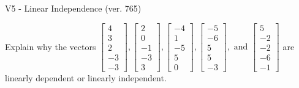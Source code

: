 \begin{exercise}
  \begin{exerciseTitle}V5 - Linear Independence (ver. 765)\end{exerciseTitle}
  \begin{exerciseStatement}
    Explain why the vectors \(\left[\begin{array}{r}
4 \\
3 \\
2 \\
-3 \\
-3
\end{array}\right] , \left[\begin{array}{r}
2 \\
0 \\
-1 \\
-3 \\
3
\end{array}\right] , \left[\begin{array}{r}
-4 \\
1 \\
-5 \\
5 \\
0
\end{array}\right] , \left[\begin{array}{r}
-5 \\
-6 \\
5 \\
5 \\
-3
\end{array}\right] , \text{ and } \left[\begin{array}{r}
5 \\
-2 \\
-2 \\
-6 \\
-1
\end{array}\right]\) are linearly dependent or linearly independent.	



\end{exerciseStatement}
\end{exercise}
